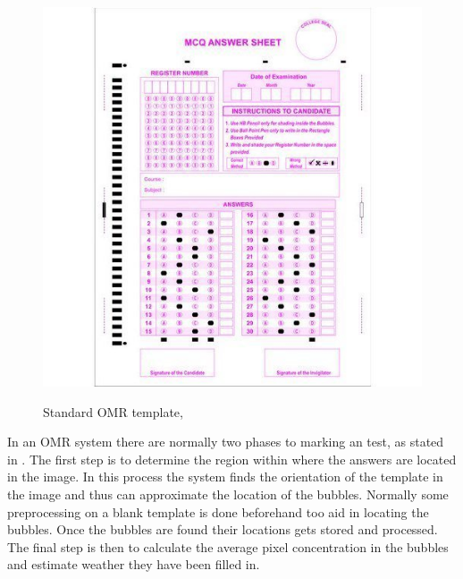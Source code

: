 \begin{figure}
  \centering
  \includegraphics[width=14cm]{omrTemplate}\\
  \caption{Standard OMR template, \citet{stdTemplate}}%
  \label{fig:omrTemplate}
\end{figure}

In an OMR system there are normally two phases to marking an test, as stated in \citet{DraganI2003}. The first step is to determine the region within where the answers are located in the image. In this process the system finds the orientation of the template in the image and thus can approximate the location of the bubbles. Normally some preprocessing on a blank template is done beforehand too aid in locating the bubbles. Once the bubbles are found their locations gets stored and processed. The final step is then to calculate the average pixel concentration in the bubbles and estimate weather they have been filled in.

